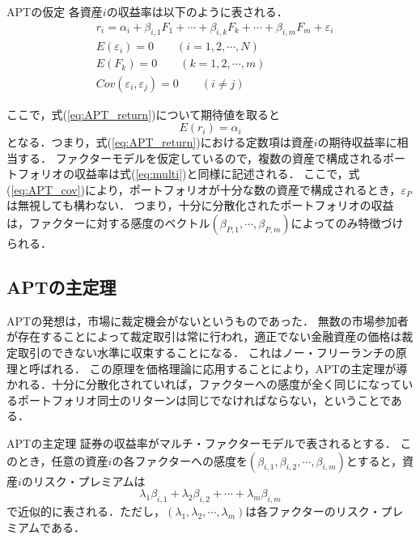 ﻿\documentclass[11pt]{jreport}
\begin{document}
\begin{itembox}[l]{APTの仮定}
各資産$i$の収益率は以下のように表される．
\begin{eqnarray}
& r_i = \alpha_i + \beta_{i,1}F_1 + \cdots + \beta_{i,k}F_k + \cdots + \beta_{i,m}F_m + \varepsilon_i\label{eq:APT_return} \\
& E(\varepsilon_i) = 0 \qquad (i=1,2,\cdots,N)\\
& E(F_k) = 0 \qquad (k=1,2,\cdots,m)\\
& Cov(\varepsilon_i, \varepsilon_j) = 0 \qquad (i \neq j) \label{eq:APT_cov}
\end{eqnarray}
\end{itembox}
ここで，式(\ref{eq:APT_return})について期待値を取ると
\begin{equation}
E(r_i) = \alpha_i
\end{equation}
となる．つまり，式(\ref{eq:APT_return})における定数項は資産$i$の期待収益率に相当する．
ファクターモデルを仮定しているので，複数の資産で構成されるポートフォリオの収益率は式(\ref{eq:multi})と同様に記述される．
ここで，式(\ref{eq:APT_cov})により，ポートフォリオが十分な数の資産で構成されるとき，$\varepsilon_P$は無視しても構わない．
つまり，十分に分散化されたポートフォリオの収益は，ファクターに対する感度のベクトル$(\beta_{P,1},\cdots,\beta_{P,m})$によってのみ特徴づけられる．




\subsection{APTの主定理}
APTの発想は，市場に裁定機会がないというものであった．
無数の市場参加者が存在することによって裁定取引は常に行われ，適正でない金融資産の価格は裁定取引のできない水準に収束することになる．
これはノー・フリーランチの原理と呼ばれる．
この原理を価格理論に応用することにより，APTの主定理が導かれる．十分に分散化されていれば，ファクターへの感度が全く同じになっているポートフォリオ同士のリターンは同じでなければならない，ということである．

\begin{itembox}[l]{APTの主定理}
証券の収益率がマルチ・ファクターモデルで表されるとする．
このとき，任意の資産$i$の各ファクターへの感度を$(\beta_{i,1},\beta_{i,2},\cdots,\beta_{i,m})$とすると，資産$i$のリスク・プレミアムは
\begin{equation}
\lambda_1\beta_{i,1} + \lambda_2\beta_{i,2} + \cdots + \lambda_m\beta_{i,m}
\label{eq:APT}
\end{equation}
で近似的に表される．ただし，$( \lambda_1, \lambda_2, \cdots ,\lambda_m )$は各ファクターのリスク・プレミアムである．
\end{itembox}
\end{document}
